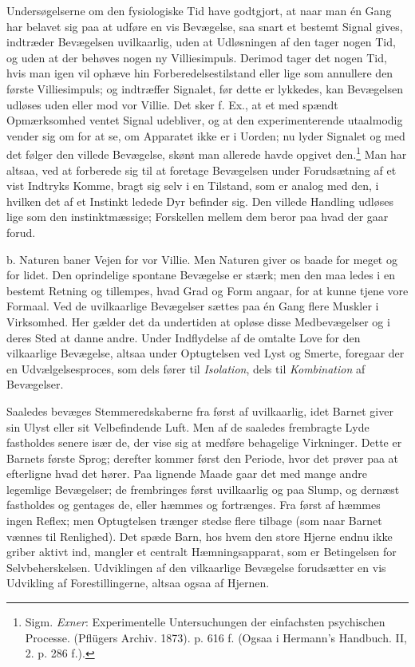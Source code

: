 \documentclass[12pt,a4paper,openany]{book}
\newcommand{\opage}[1]{\marginnote{\footnotesize\textit{[#1]}}}
\begin{document}
Undersøgelserne om den fysiologiske Tid have godtgjort, at naar man én
Gang har belavet sig paa at udføre en vis Bevægelse, saa snart et
bestemt Signal gives, indtræder Bevægelsen uvilkaarlig, uden at
Udløsningen af den tager nogen Tid, og uden at der behøves nogen ny
Villiesimpuls. Derimod tager det nogen Tid, hvis man igen vil ophæve hin
Forberedelsestilstand eller lige som annullere den første Villiesimpuls;
og indtræffer Signalet, før dette er lykkedes, kan Bevægelsen udløses
uden eller mod vor Villie. Det sker f. Ex., at et med spændt
Opmærksomhed ventet Signal udebliver, og at den experimenterende
utaalmodig vender sig om for at se, om
\opage{377}Apparatet ikke er i Uorden; nu lyder Signalet og med det
følger den villede Bevægelse, skønt man allerede havde opgivet
den.\footnote[1]{Sigm. \emph{Exner}: Experimentelle Untersuchungen der
einfachsten psychischen Processe. (Pflügers Archiv. 1873). p. 616 f.
(Ogsaa i Hermann’s Handbuch. II, 2. p. 286 f.).} Man har altsaa, ved at
forberede sig til at foretage Bevægelsen under Forudsætning af et vist
Indtryks Komme, bragt sig selv i en Tilstand, som er analog med den, i
hvilken det af et Instinkt ledede Dyr befinder sig. Den villede Handling
udløses lige som den instinktmæssige; Forskellen mellem dem beror paa
hvad der gaar forud.

b. Naturen baner Vejen for vor Villie. Men Naturen giver os baade for
meget og for lidet. Den oprindelige spontane Bevægelse er stærk; men den
maa ledes i en bestemt Retning og tillempes, hvad Grad og Form angaar,
for at kunne tjene vore Formaal. Ved de uvilkaarlige Bevægelser sættes
paa én Gang flere Muskler i Virksomhed. Her gælder det da undertiden at
opløse disse Medbevægelser og i deres Sted at danne andre. Under
Indflydelse af de omtalte Love for den vilkaarlige Bevægelse, altsaa
under Optugtelsen ved Lyst og Smerte, foregaar der en Udvælgelsesproces,
som dels fører til \emph{Isolation}, dels til \emph{Kombination} af
Bevægelser.

Saaledes bevæges Stemmeredskaberne fra først af uvilkaarlig, idet Barnet
giver sin Ulyst eller sit Velbefindende Luft. Men af de saaledes
frembragte Lyde fastholdes senere især de, der vise sig at medføre
behagelige Virkninger. Dette er Barnets første Sprog; derefter kommer
først den Periode, hvor det prøver paa at efterligne hvad det hører. Paa
lignende Maade gaar det med mange andre legemlige Bevægelser; de
frembringes først uvilkaarlig og paa Slump, og dernæst fastholdes og
gentages de, eller hæmmes og fortrænges. Fra først af hæmmes ingen
Reflex; men Optugtelsen trænger stedse flere tilbage (som naar Barnet
vænnes til Renlighed). Det spæde Barn, hos hvem den store Hjerne endnu
ikke griber aktivt ind, mangler et centralt Hæmningsapparat, som er
Betingelsen for Selvbeherskelsen. Udviklingen af den vilkaarlige
Bevægelse forudsætter en vis Udvikling af Forestillingerne, altsaa ogsaa
af Hjernen.
\end{document}
